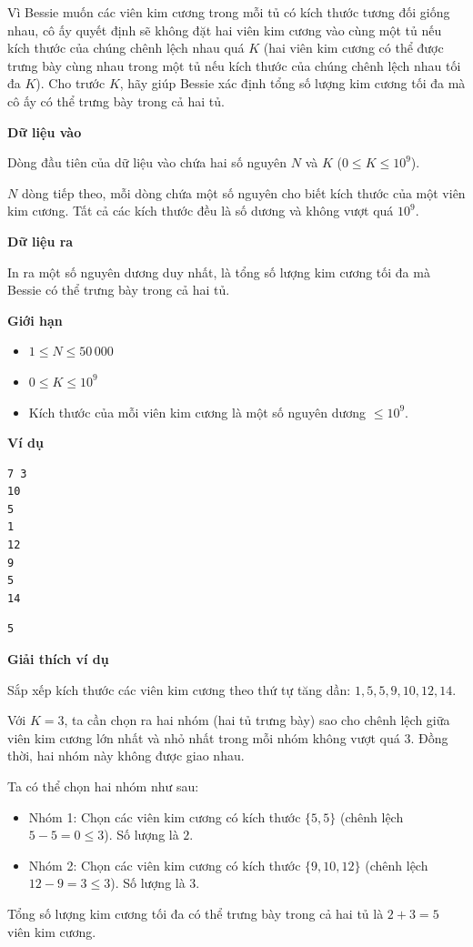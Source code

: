 \documentclass[12pt,a4paper]{article}
\newcommand{\inputformat}{%
  \vspace{6pt}\textbf{\textcolor{sectioncolor}{Dữ liệu vào}}\par\vspace{2pt}%
}
\newcommand{\outputformat}{%
  \vspace{6pt}\textbf{\textcolor{sectioncolor}{Dữ liệu ra}}\par\vspace{2pt}%
}
\newcommand{\constraints}{%
  \vspace{6pt}\textbf{\textcolor{sectioncolor}{Giới hạn}}\par\vspace{2pt}%
}
\newcommand{\example}{%
  \vspace{6pt}\textbf{\textcolor{sectioncolor}{Ví dụ}}\par\vspace{2pt}%
}
\newcommand{\explanation}{%
  \vspace{6pt}\textbf{\textcolor{sectioncolor}{Giải thích ví dụ}}\par\vspace{2pt}%
}
\begin{document}
Vì Bessie muốn các viên kim cương trong mỗi tủ có kích thước tương đối giống nhau, cô ấy quyết định sẽ không đặt hai viên kim cương vào cùng một tủ nếu kích thước của chúng chênh lệch nhau quá $K$ (hai viên kim cương có thể được trưng bày cùng nhau trong một tủ nếu kích thước của chúng chênh lệch nhau tối đa $K$). Cho trước $K$, hãy giúp Bessie xác định tổng số lượng kim cương tối đa mà cô ấy có thể trưng bày trong cả hai tủ.

\inputformat
\begin{inputbox}
Dòng đầu tiên của dữ liệu vào chứa hai số nguyên $N$ và $K$ ($0 \le K \le 10^9$).

$N$ dòng tiếp theo, mỗi dòng chứa một số nguyên cho biết kích thước của một viên kim cương. Tất cả các kích thước đều là số dương và không vượt quá $10^9$.
\end{inputbox}

\outputformat
\begin{outputbox}
In ra một số nguyên dương duy nhất, là tổng số lượng kim cương tối đa mà Bessie có thể trưng bày trong cả hai tủ.
\end{outputbox}

\constraints
\begin{constraintbox}
\begin{itemize}
    \item $1 \le N \le 50\,000$
    \item $0 \le K \le 10^9$
    \item Kích thước của mỗi viên kim cương là một số nguyên dương $\le 10^9$.
\end{itemize}
\end{constraintbox}

\example
\begin{lstlisting}
7 3
10
5
1
12
9
5
14
\end{lstlisting}
\begin{lstlisting}
5
\end{lstlisting}

\explanation
Sắp xếp kích thước các viên kim cương theo thứ tự tăng dần: $1, 5, 5, 9, 10, 12, 14$. 

Với $K = 3$, ta cần chọn ra hai nhóm (hai tủ trưng bày) sao cho chênh lệch giữa viên kim cương lớn nhất và nhỏ nhất trong mỗi nhóm không vượt quá $3$. Đồng thời, hai nhóm này không được giao nhau.

Ta có thể chọn hai nhóm như sau:
\begin{itemize}
    \item Nhóm 1: Chọn các viên kim cương có kích thước $\{5, 5\}$ (chênh lệch $5 - 5 = 0 \le 3$). Số lượng là $2$.
    \item Nhóm 2: Chọn các viên kim cương có kích thước $\{9, 10, 12\}$ (chênh lệch $12 - 9 = 3 \le 3$). Số lượng là $3$.
\end{itemize}
Tổng số lượng kim cương tối đa có thể trưng bày trong cả hai tủ là $2 + 3 = 5$ viên kim cương.
\end{document}
